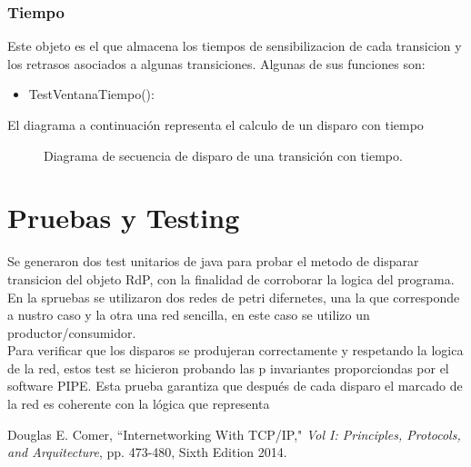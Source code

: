 \documentclass[10pt, a4paper,notitlepage]{article}
\begin{document}
\subsubsection{Tiempo}
Este objeto es el que almacena los tiempos de sensibilizacion de cada transicion y los retrasos asociados a algunas transiciones. Algunas de sus funciones son:
\begin{itemize}
	\item TestVentanaTiempo(): 
\end{itemize}
El diagrama a continuación representa el calculo de un disparo con tiempo
\begin{figure}[H] %
	\caption{Diagrama de secuencia de disparo de una transición con tiempo.}
	\label{fig:sec2}
\end{figure}

\section{Pruebas y Testing}
Se generaron dos test unitarios de java para probar el metodo de disparar transicion del objeto RdP, con la finalidad de corroborar la logica del programa. En la spruebas se utilizaron dos redes de petri difernetes, una la que corresponde a nustro caso y la otra una red sencilla, en este caso se utilizo un productor/consumidor.\\
Para verificar que los disparos se produjeran correctamente y respetando la logica de la red, estos test se hicieron probando las p invariantes proporciondas por el software PIPE. Esta prueba garantiza que después de cada disparo el marcado de la red es coherente con la lógica que representa
\begin{thebibliography}{100} %
 Douglas E. Comer, ``Internetworking With TCP/IP," \emph{Vol I: Principles, Protocols, and Arquitecture}, pp. 473-480, Sixth Edition 2014.
\end{thebibliography}
\end{document}
